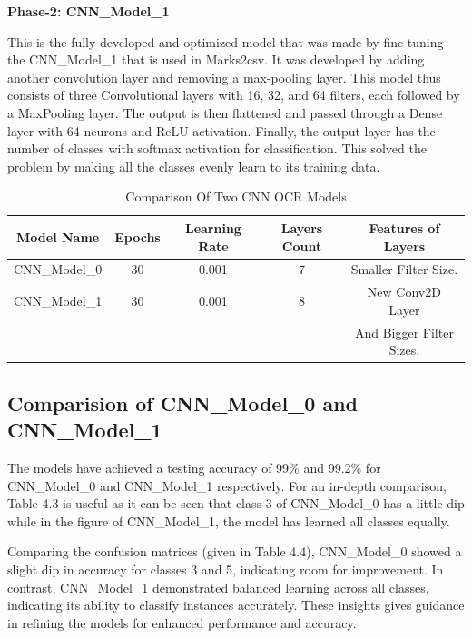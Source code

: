 \noindent \textbf{Phase-2: CNN\_Model\_1} 

\noindent This is the fully developed and optimized model that was made by fine-tuning the CNN\_Model\_1 that is used in Marks2csv. It was developed by adding another convolution layer and removing a max-pooling layer. This model thus consists of three Convolutional layers with 16, 32, and 64 filters, each followed by a MaxPooling layer. The output is then flattened and passed through a Dense layer with 64 neurons and ReLU activation. Finally, the output layer has the number of classes with softmax activation for classification. This solved the problem by making all the classes evenly learn to its training data.

\vspace{3mm}

\begin{table}[h]
    \centering
    \begin{tabular}{|c|c|c|c|c|}
    \hline
    Model Name & Epochs & Learning Rate & Layers Count & Features of Layers \\
    \hline
    CNN\_Model\_0 & 30 & 0.001 & 7 & Smaller Filter Size.\\
    \hline
    CNN\_Model\_1 & 30 & 0.001 & 8 & New Conv2D Layer\\
     & & & & And Bigger Filter Sizes.\\
    \hline
    \end{tabular}
    \caption{Comparison Of Two CNN OCR Models}
\end{table}  

\clearpage

\subsection{Comparision of CNN\_Model\_0 and CNN\_Model\_1}

\noindent The models have achieved a testing accuracy of 99\% and 99.2\% for CNN\_Model\_0 and CNN\_Model\_1 respectively. For an in-depth comparison, Table 4.3 is useful as it can be seen that class 3 of CNN\_Model\_0 has a little dip while in the figure of CNN\_Model\_1, the model has learned all classes equally.

\noindent Comparing the confusion matrices (given in Table 4.4), CNN\_Model\_0 showed a slight dip in accuracy for classes 3 and 5, indicating room for improvement. In contrast, CNN\_Model\_1 demonstrated balanced learning across all classes, indicating its ability to classify instances accurately. These insights gives guidance in refining the models for enhanced performance and accuracy.

